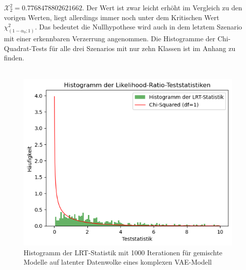 \documentclass[%
thesis=student,%
coverpage=false,%
titlepage=false,%
headmarks=true, %
german,%
font=libertine, %
math=newpxtx, %
BCOR=5mm,%
coverBCOR=11mm%
]{tumbook}
\theoremstyle{break}
\begin{document}
$\mathcal{X}^2_2 = 0.7768478802621662$. Der Wert ist zwar leicht erhöht im Vergleich zu den vorigen Werten, liegt allerdings immer noch unter dem Kritischen Wert $\chi^2_{(1-\alpha_0; 1)}$. Das bedeutet die Nullhypothese wird auch in dem letztem Szenario mit einer erkennbaren Verzerrung angenommen. Die Histogramme der Chi-Quadrat-Tests für alle drei Szenarios mit nur zehn Klassen ist im Anhang zu finden. \\
\\
\begin{figure}[h]
	\centering
	\includegraphics[scale=0.5]{plots/4_latent_dim_VAE.png}
	\caption{Histogramm der LRT-Statistik mit 1000 Iterationen für gemischte Modelle auf latenter Datenwolke eines komplexen VAE-Modell}
	\label{fig:HIST_4latentdim}
\end{figure}
\end{document}

